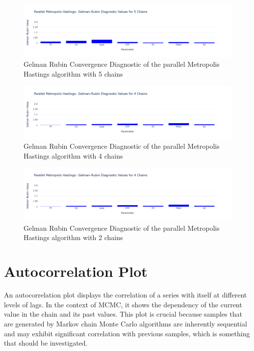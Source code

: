 \begin{figure}[H]
    \centering
    \includegraphics[width=1\textwidth]{figures/parallel_mh/GR_5.png}
    \captionsetup{width=.8\textwidth}
    \caption{Gelman Rubin Convergence Diagnostic of the parallel Metropolis Hastings algorithm with 5 chains}
    \label{fig:enter-label}
\end{figure}

\begin{figure}[H]
    \centering
    \includegraphics[width=1\textwidth]{figures/parallel_mh/GR_4.png}
    \captionsetup{width=.8\textwidth}
    \caption{Gelman Rubin Convergence Diagnostic of the parallel Metropolis Hastings algorithm with 4 chains}
    \label{fig:enter-label}
\end{figure}

\begin{figure}[H]
    \centering
    \includegraphics[width=1\textwidth]{figures/parallel_mh/GR_2.png}
    \captionsetup{width=.8\textwidth}
    \caption{Gelman Rubin Convergence Diagnostic of the parallel Metropolis Hastings algorithm with 2 chains}
    \label{fig:enter-label}
\end{figure}



\section{Autocorrelation Plot}
An autocorrelation plot displays the correlation of a series with itself at different levels of lags. In the context of MCMC, it shows the dependency of the current value in the chain and its past values. This plot is crucial because samples that are generated by Markov chain Monte Carlo algorithms are inherently sequential and may exhibit significant correlation with previous samples, which is something that should be investigated. 


